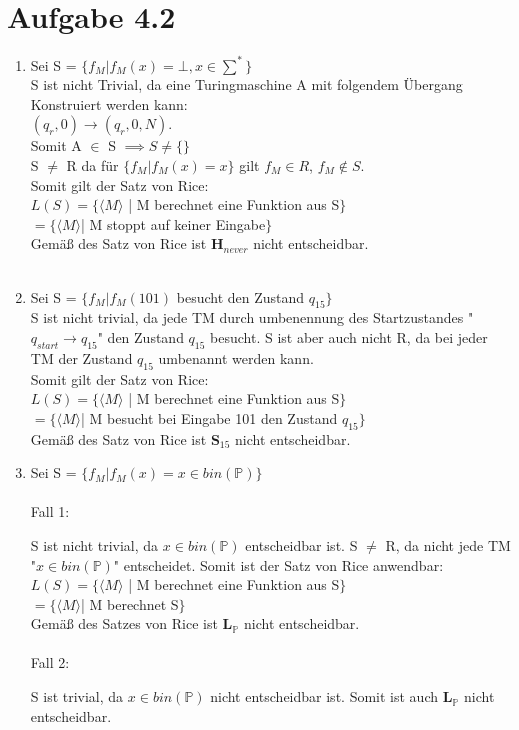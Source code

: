 \documentclass{article}
\begin{document}
	\section[a 4.2]{Aufgabe 4.2}
		\begin{enumerate} [label=\alph*.]
			\item Sei S = $\{f_M|f_M(x) = \bot, x \in \sum^*\}$\\
			S ist nicht Trivial, da eine Turingmaschine A mit folgendem Übergang Konstruiert werden kann: \\$(q_r,0) \rightarrow (q_r,0,N)$.\\ Somit A $\in$ S $\implies S \neq \{\}$\\
			S $\neq$ R da für $\{f_M|f_M(x) = x\}$ gilt $f_M \in R$, $f_M \notin S$.\\
			Somit gilt der Satz von Rice:\\
			$L(S) = \{\langle M\rangle$ | M berechnet eine Funktion aus S$\}$\\
			$= \{\langle M\rangle $| M stoppt auf keiner Eingabe$\}$\\
			Gemäß des Satz von Rice ist $\textbf{H}_{never}$ nicht entscheidbar.\\\\
			
			\item Sei S = $\{f_M|f_M(101)$ besucht den Zustand $q_{15}\}$\\
			S ist nicht trivial, da jede TM durch umbenennung des Startzustandes "$q_{start} \rightarrow q_{15}$" den Zustand $q_{15}$ besucht. S ist aber auch nicht R, da bei jeder TM der Zustand $q_{15}$ umbenannt werden kann.\\
			Somit gilt der Satz von Rice:\\
			$L(S) = \{\langle M\rangle$ | M berechnet eine Funktion aus S$\}$\\
			$= \{\langle M\rangle $| M besucht bei Eingabe 101 den Zustand $ q_{15}\}$\\
			Gemäß des Satz von Rice ist $\textbf{S}_{15}$ nicht entscheidbar.\\
			
			\item Sei S = $\{f_M|f_M(x) = x \in bin(\mathbb{P})\}$\\\\
			Fall 1: \par S ist nicht trivial, da $x \in bin(\mathbb{P})$ entscheidbar ist. S $\neq$ R, da nicht jede TM "$x \in bin(\mathbb{P})$" entscheidet. Somit ist der Satz von Rice anwendbar:\\
			$L(S) = \{\langle M\rangle$ | M berechnet eine Funktion aus S$\}$\\
			$= \{\langle M\rangle $| M berechnet S$\}$\\
			Gemäß des Satzes von Rice ist $\textbf{L}_{\mathbb{P}}$ nicht entscheidbar.\\\\
			Fall 2: \par S ist trivial, da $x \in bin(\mathbb{P})$ nicht entscheidbar ist. Somit ist auch $\textbf{L}_{\mathbb{P}}$ nicht entscheidbar.\\
			\end{enumerate}
\end{document}
